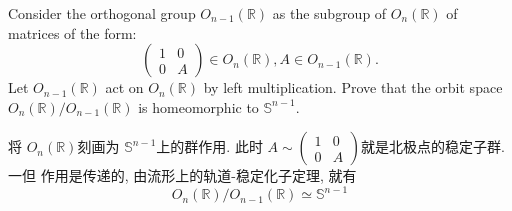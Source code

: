 \documentclass[../main.tex]{subfiles}
\begin{document}
\begin{problem}{}{}
    Consider the orthogonal group $O_{n-1}(\mathbb{R})$ as the subgroup of $O_n(\mathbb{R})$ of matrices of the form:
\[
\begin{pmatrix}
1 & 0 \\
0 & A
\end{pmatrix} \in O_n(\mathbb{R}), A \in O_{n-1}(\mathbb{R}).
\]
Let $O_{n-1}(\mathbb{R})$ act on $O_n(\mathbb{R})$ by left multiplication. Prove that the orbit space $O_n(\mathbb{R})/O_{n-1}(\mathbb{R})$ is homeomorphic to $\mathbb{S}^{n-1}$.
\end{problem}
\begin{proofsketch}
    将 \(  O_{n}\left( \mathbb{R}  \right)   \)刻画为 \(  \mathbb{S}^{n-1}  \)上的群作用. 此时 \(  A \sim \begin{pmatrix} 
        1&0\\ 
         0&A 
    \end{pmatrix}   \)就是北极点的稳定子群. 一但 作用是传递的, 由流形上的轨道-稳定化子定理, 就有   \[
    O_{n}\left( \mathbb{R}  \right)/ O_{n-1}\left( \mathbb{R}  \right)\simeq \mathbb{S}^{n-1}  
    \]
\end{proofsketch}
\end{document}
